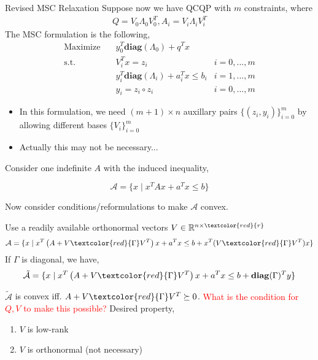 \documentclass[aspectratio=1610, 9pt]{beamer}
\newcommand{\diag}{\mathbf{diag}}
\newcommand{\red}[1]{\textcolor{red}{#1}}
\newcommand{\real}{\mathbb{R}}
\begin{document}
\begin{frame}[allowframebreaks]{Revised MSC Relaxation}
  Suppose now we have QCQP with \(m\) constraints, where
  \begin{align*}
    Q = V_0\Lambda_0V_0^T, A_i = V_i\Lambda_iV_i^T
  \end{align*}
  The MSC formulation is the following,
  \begin{align}
    \nonumber \mathrm{Maximize}\quad & y_0 ^T\diag(\Lambda_0) + q^Tx                         \\
    \mathrm{s.t.} \quad              & V_i^T x = z_i                             & i=0,...,m \\
                                     & y_i ^T\diag(\Lambda_i)  + a_i^Tx  \le b_i & i=1,...,m \\
    \label{quad}                     & y_i = z_i \circ z_i                       & i=0,...,m
  \end{align}
  \begin{itemize}
    \item In this formulation, we need \((m + 1) \times n\) auxillary pairs \(\{(z_i, y_i)\}_{i=0}^m\) by allowing different bases \(\{V_i\}_{i=0}^m\)
    \item Actually this may not be necessary...
  \end{itemize}

  \framebreak
  Consider one indefinite \(A\) with the induced inequality,

  \[\mathcal A =  \{x \mid x^TAx +a^Tx \le b\}\]

  Now consider conditions/reformulations to make \(\mathcal A\) convex.

  Use a readily available orthonormal vectors \(V \in \real^{n\times\red{r}}\)
  \[\mathcal A =  \{x \mid x^T\left(A + V\red{\Gamma}V^T\right )x +a^Tx \le b + x^T(V\red{\Gamma}V^T)x\}\]
  If \(\Gamma\) is diagonal, we have,
  \[\tilde {\mathcal  A} =  \{x \mid x^T\left(A + V\red{\Gamma}V^T\right )x + a^Tx \le b +\diag(\Gamma)^T y\}\]


  \(\tilde {\mathcal  A}\) is convex iff. \(A + V\red{\Gamma}V^T \succeq 0\). \red{What is the condition for \(Q, V\) to make this possible?} Desired property,
  \begin{enumerate}
    \item \(V\) is low-rank
    \item \(V\) is orthonormal (not necessary)
  \end{enumerate}

\end{frame}
\end{document}
